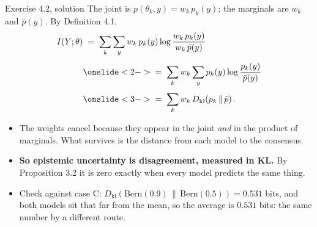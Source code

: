 \documentclass[aspectratio=169,9pt]{beamer}
\newcommand{\orange}[1]{\textcolor{AmazonOrange}{\textbf{#1}}}
\newcommand{\muted}[1]{\textcolor{EPICMuted}{#1}}
\newcommand{\KL}[2]{D_{\mathrm{kl}}\!\left(#1 \,\|\, #2\right)}
\begin{document}
\begin{frame}{Exercise 4.2, solution}
The joint is $p(\theta_k, y) = w_k\, p_k(y)$; the marginals are $w_k$ and $\bar p(y)$. By Definition 4.1,
\vspace{-0.1cm}
\begin{align*}
    I(Y;\theta) &\;=\; \sum_{k}\sum_{y} w_k\, p_k(y)
                   \log \frac{w_k\, p_k(y)}{w_k\, \bar p(y)} \\[0.12cm]
                &\onslide<2->{\;=\; \sum_{k} w_k \sum_{y} p_k(y) \log \frac{p_k(y)}{\bar p(y)}} \\[0.12cm]
                &\onslide<3->{\;=\; \sum_{k} w_k \, \KL{p_k}{\bar p} .}
\end{align*}
\vspace{-0.2cm}
\begin{itemize}
    \item<4-> The weights cancel because they appear in the joint \textit{and} in the product of marginals.
    What survives is the distance from each model to the consensus.
    \item<5-> \orange{So epistemic uncertainty is disagreement, measured in KL.} By Proposition 3.2 it is zero
    exactly when every model predicts the same thing.
    \item<6-> \muted{Check against case C: $\KL{\text{Bern}(0.9)}{\text{Bern}(0.5)} = 0.531$ bits, and both
    models sit that far from the mean, so the average is $0.531$ bits: the same number by a different route.}
\end{itemize}
\end{frame}
\end{document}
